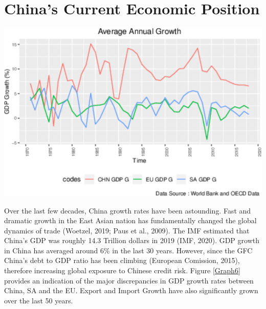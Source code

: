 \documentclass[11pt,preprint, authoryear]{elsarticle}
\let\origfigure\figure
\let\endorigfigure\endfigure
\renewenvironment{figure}[1][2] {
    \expandafter\origfigure\expandafter[H]
} {
    \endorigfigure
}
\numberwithin{equation}{section}
\numberwithin{figure}{section}
\numberwithin{table}{section}
\begin{document}
\hypertarget{chinas-current-economic-position}{%
\section{\texorpdfstring{China's Current Economic Position
\label{China's Current Economic Position}}{China's Current Economic Position }}\label{chinas-current-economic-position}}

\begin{figure}[H]

{\centering \includegraphics{tradedynamics1_files/figure-latex/Graph6-1} 

}

\caption{Growth in GDP 1960-2019 \label{Graph6}}\label{fig:Graph6}
\end{figure}

Over the last few decades, China growth rates have been astounding. Fast
and dramatic growth in the East Asian nation has fundamentally changed
the global dynamics of trade (Woetzel, 2019; Paus et al., 2009). The IMF
estimated that China's GDP was roughly 14.3 Trillion dollars in 2019
(IMF, 2020). GDP growth in China has averaged around 6\% in the last 30
years. However, since the GFC China's debt to GDP ratio has been
climbing (European Comission, 2015), therefore increasing global
exposure to Chinese credit risk. Figure \ref{Graph6} provides an
indication of the major discrepancies in GDP growth rates between China,
SA and the EU. Export and Import Growth have also significantly grown
over the last 50 years.
\end{document}
